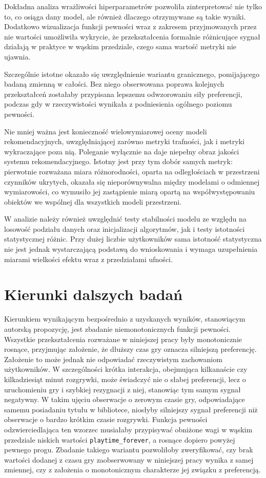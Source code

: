 Dokładna analiza wrażliwości hiperparametrów pozwoliła zinterpretować nie tylko to, co osiąga dany model, ale również dlaczego otrzymywane są takie wyniki. Dodatkowo wizualizacja funkcji pewności wraz z zakresem przyjmowanych przez nie wartości umożliwiła wykrycie, że przekształcenia formalnie różnicujące sygnał działają w praktyce w wąskim przedziale, czego sama wartość metryki nie ujawnia.

Szczególnie istotne okazało się uwzględnienie wariantu granicznego, pomijającego badaną zmienną w całości. Bez niego obserwowana poprawa kolejnych przekształceń zostałaby przypisana lepszemu odwzorowaniu siły preferencji, podczas gdy w rzeczywistości wynikała z podniesienia ogólnego poziomu pewności.

Nie mniej ważna jest konieczność wielowymiarowej oceny modeli rekomendacyjnych, uwzględniającej zarówno metryki trafności, jak i metryki wykraczające poza nią. Poleganie wyłącznie na \ndcg{} daje niepełny obraz jakości systemu rekomendacyjnego. Istotny jest przy tym dobór samych metryk: pierwotnie rozważana miara różnorodności, oparta na odległościach w przestrzeni czynników ukrytych, okazała się nieporównywalna między modelami o odmiennej wymiarowości, co wymusiło jej zastąpienie miarą opartą na współwystępowaniu obiektów we wspólnej dla wszystkich modeli przestrzeni.

W analizie należy również uwzględnić testy stabilności modelu ze względu na losowość podziału danych oraz inicjalizacji algorytmów, jak i testy istotności statystycznej różnic. Przy dużej liczbie użytkowników sama istotność statystyczna nie jest jednak wystarczającą podstawą do wnioskowania i wymaga uzupełnienia miarami wielkości efektu wraz z przedziałami ufności.

\section{Kierunki dalszych badań}

Kierunkiem wynikającym bezpośrednio z uzyskanych wyników, stanowiącym autorską propozycję, jest zbadanie niemonotonicznych funkcji pewności. Wszystkie przekształcenia rozważane w niniejszej pracy były monotonicznie rosnące, przyjmując założenie, że dłuższy czas gry oznacza silniejszą preferencję. Założenie to może jednak nie odpowiadać rzeczywistym zachowaniom użytkowników. W szczególności krótka interakcja, obejmująca kilkanaście czy kilkadziesiąt minut rozgrywki, może świadczyć nie o słabej preferencji, lecz o uruchomieniu gry i szybkiej rezygnacji z niej, stanowiąc tym samym sygnał negatywny. W takim ujęciu obserwacje o zerowym czasie gry, odpowiadające samemu posiadaniu tytułu w bibliotece, niosłyby silniejszy sygnał preferencji niż obserwacje o bardzo krótkim czasie rozgrywki. Funkcja pewności odzwierciedlająca ten wzorzec musiałaby przypisywać obniżone wagi w wąskim przedziale niskich wartości \texttt{playtime\_forever}, a rosnące dopiero powyżej pewnego progu. Zbadanie takiego wariantu pozwoliłoby zweryfikować, czy brak wartości dodanej z czasu gry zaobserwowany w niniejszej pracy wynika z samej zmiennej, czy z założenia o monotonicznym charakterze jej związku z preferencją.


